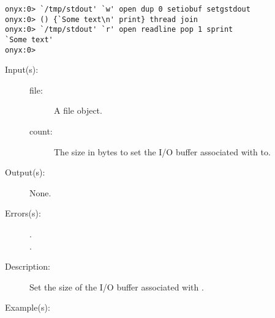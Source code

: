 \begin{description}
\begin{description}
\begin{verbatim}
onyx:0> `/tmp/stdout' `w' open dup 0 setiobuf setgstdout
onyx:0> () {`Some text\n' print} thread join
onyx:0> `/tmp/stdout' `r' open readline pop 1 sprint
`Some text'
onyx:0>
		\end{verbatim}
	\end{description}
\label{systemdict:setiobuf}
\item[{\onyxop{file count}{setiobuf}{--}}: ]
	\begin{description}\item[]
	\item[Input(s): ]
		\begin{description}\item[]
		\item[file: ]
			A file object.
		\item[count: ]
			The size in bytes to set the I/O buffer associated with
			 to.
		\end{description}
	\item[Output(s): ] None.
	\item[Errors(s): ]
		\begin{description}\item[]
		\item[.]
		\item[.]
		\end{description}
	\item[Description: ]
		Set the size of the I/O buffer associated with .
	\item[Example(s): ]\begin{verbatim}


\end{verbatim}
\end{description}
\end{description}
